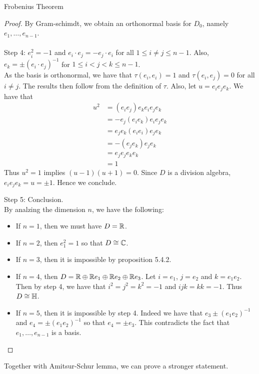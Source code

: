 \documentclass[a4paper]{article}
\begin{document}
\begin{thm}{Frobenius Theorem}{}
\begin{proof}
By Gram-schimdt, we obtain an orthonormal basis for $D_0$, namely $e_1,\dots,e_{n-1}$. \\~\\

Step 4: $e_i^2=-1$ and $e_i\cdot e_j=-e_j\cdot e_i$ for all $1\leq i\neq j\leq n-1$. Also, $e_k=\pm(e_i\cdot e_j)^{-1}$ for $1\leq i<j<k\leq n-1$. \\
As the basis is orthonormal, we have that $\tau(e_i,e_i)=1$ and $\tau(e_i,e_j)=0$ for all $i\neq j$. The results then follow from the definition of $\tau$. Also, let $u=e_ie_je_k$. We have that 
\begin{align*}
u^2&=(e_ie_j)e_ke_ie_je_k\\
&=-e_j(e_ie_k)e_ie_je_k\\
&=e_je_k(e_ie_i)e_je_k\\
&=-(e_je_k)e_je_k\\
&=e_je_je_ke_k\\
&=1
\end{align*}
Thus $u^2=1$ implies $(u-1)(u+1)=0$. Since $D$ is a division algebra, $e_ie_je_k=u=\pm1$. Hence we conclude. 

Step 5: Conclusion. \\
By analzing the dimension $n$, we have the following: 
\begin{itemize}
\item If $n=1$, then we must have $D=\mathbb{R}$. 
\item If $n=2$, then $e_1^2=1$ so that $D\cong\mathbb{C}$. 
\item If $n=3$, then it is impossible by proposition 5.4.2. 
\item If $n=4$, then $D=\mathbb{R}\oplus\mathbb{R} e_1\oplus\mathbb{R} e_2\oplus\mathbb{R} e_3$. Let $i=e_1$, $j=e_2$ and $k=e_1e_2$. Then by step 4, we have that $i^2=j^2=k^2=-1$ and $ijk=kk=-1$. Thus $D\cong\mathbb{H}$. 
\item If $n=5$, then it is impossible by step 4. Indeed we have that $e_3\pm(e_1e_2)^{-1}$ and $e_4=\pm(e_1e_2)^{-1}$ so that $e_4=\pm e_3$. This contradicts the fact that $e_1,\dots,e_{n-1}$ is a basis. 
\end{itemize}
\end{proof}
\end{thm}

Together with Amitsur-Schur lemma, we can prove a stronger statement. 
\end{document}
